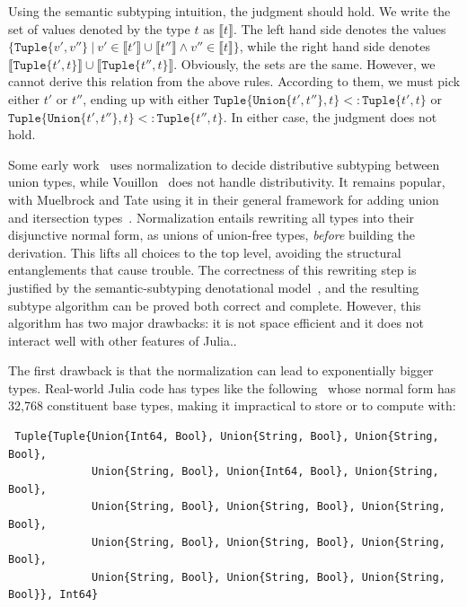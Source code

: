\documentclass[a4paper,english]{lipics-v2019}
\newcommand{\xt}[1]{\texttt{#1}}
\newcommand{\union}[2]{\xt{Union\{}#1,#2\xt{\}}}
\newcommand{\sub}{<:}
\newcommand{\tuple}[1]{\xt{Tuple\{}#1\xt{\}}}
\begin{document}
%
\vspace{-3mm}{\small\[
\tuple{\union{t'}{t''}, t} \ \ \sub\ \ \union{\tuple{t', t}}{\tuple{t'', t}} 
\]}
\vspace{-3mm}
%

\noindent Using the semantic subtyping intuition, the judgment should hold. We write the
set of values denoted by the type $t$ as {\small $\llbracket t \rrbracket$}.
The left hand side denotes the values {\small $\{\tuple{v',v''} ~|~ v' \in
  \llbracket t' \rrbracket \cup \llbracket t'' \rrbracket \wedge v'' \in
  \llbracket t \rrbracket\}$}, while the right hand side denotes {\small
  $\llbracket \tuple{t', t} \rrbracket \cup \llbracket \tuple{t'', t}
  \rrbracket$}.  Obviously, the sets are the same. However, we cannot derive
this relation from the above rules. According to them, we must pick either
{\small $t'$} or {\small $t''$}, ending up with either {\small
  $\tuple{\union{t'}{t''}, t} \sub \tuple{t', t}$} or {\small
  $\tuple{\union{t'}{t''}, t} \sub \tuple{t'', t}$}. In either case, the
judgment does not hold.

Some early work~\cite{barbanera1991intersection,Pierce1991,aiken1991implementing} uses
normalization to decide distributive subtyping between union types, while
Vouillon~\cite{Vouillon04} does not handle distributivity. It remains popular, with
Muelbrock and Tate using it in their general framework for adding union and itersection types~\cite{muehlboeck2018empowering}. Normalization
entails rewriting all types into their disjunctive normal form, as unions of
union-free types, \emph{before} building the derivation. This lifts all
choices to the top level, avoiding the structural entanglements that cause
trouble. The correctness of this rewriting step is justified by the
semantic-subtyping denotational model~\cite{Frisch08}, and the resulting
subtype algorithm can be proved both correct and complete. However, this
algorithm has two major drawbacks: it is not space efficient and it does not
interact well with other features of Julia..

The first drawback is that the normalization can lead to exponentially
bigger types. Real-world Julia code has types like the
following~\cite{DBLP:NardelliBPCBV18} whose normal form has 32,768
constituent base types, making it impractical to store or to compute with:


\begin{small}
\begin{verbatim}
 Tuple{Tuple{Union{Int64, Bool}, Union{String, Bool}, Union{String, Bool}, 
             Union{String, Bool}, Union{Int64, Bool}, Union{String, Bool}, 
             Union{String, Bool}, Union{String, Bool}, Union{String, Bool}, 
             Union{String, Bool}, Union{String, Bool}, Union{String, Bool}, 
             Union{String, Bool}, Union{String, Bool}, Union{String, Bool}}, Int64}
\end{verbatim}
\end{small}
\end{document}
